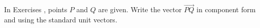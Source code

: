{\noindent In Exercises}
{, points $P$ and $Q$ are given. Write the vector $\overrightarrow{PQ}$ in component form and using the standard unit vectors.
}
